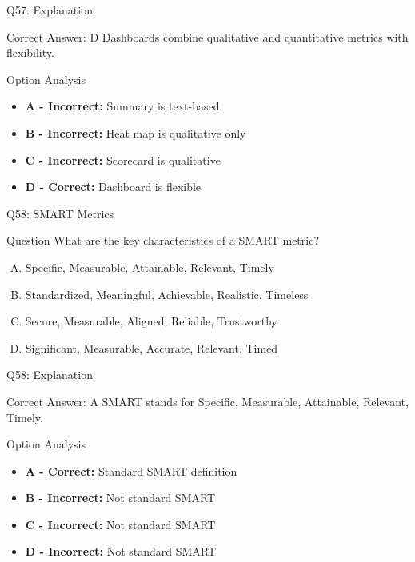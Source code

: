 \documentclass{beamer}
\begin{document}
	\begin{frame}{Q57: Explanation}
		\begin{block}{Correct Answer: D}
			Dashboards combine qualitative and quantitative metrics with flexibility.
		\end{block}
		\begin{block}{Option Analysis}
			\begin{itemize}
				\item \textbf{A - Incorrect:} Summary is text-based
				\item \textbf{B - Incorrect:} Heat map is qualitative only
				\item \textbf{C - Incorrect:} Scorecard is qualitative
				\item \textbf{D - Correct:} Dashboard is flexible
			\end{itemize}
		\end{block}
	\end{frame}
	
	\begin{frame}{Q58: SMART Metrics}
		\begin{block}{Question}
			What are the key characteristics of a SMART metric?
		\end{block}
		\begin{enumerate}[(A)]
			\item Specific, Measurable, Attainable, Relevant, Timely
			\item Standardized, Meaningful, Achievable, Realistic, Timeless
			\item Secure, Measurable, Aligned, Reliable, Trustworthy
			\item Significant, Measurable, Accurate, Relevant, Timed
		\end{enumerate}
	\end{frame}
	
	\begin{frame}{Q58: Explanation}
		\begin{block}{Correct Answer: A}
			SMART stands for Specific, Measurable, Attainable, Relevant, Timely.
		\end{block}
		\begin{block}{Option Analysis}
			\begin{itemize}
				\item \textbf{A - Correct:} Standard SMART definition
				\item \textbf{B - Incorrect:} Not standard SMART
				\item \textbf{C - Incorrect:} Not standard SMART
				\item \textbf{D - Incorrect:} Not standard SMART
			\end{itemize}
		\end{block}
	\end{frame}
	
\end{document}
